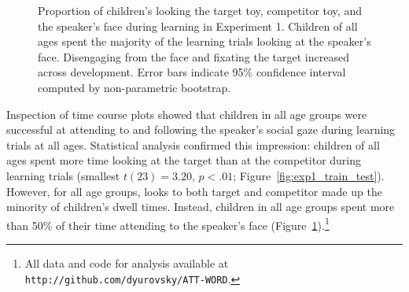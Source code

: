 \documentclass[man,floatsintext]{apa6}
\begin{document}
 \begin{figure}[tb]
	\caption{\label{fig:exp1_train} Proportion of children's looking the target toy, competitor toy, and the speaker's face during learning in Experiment 1. Children of all ages spent the majority of the learning trials looking at the speaker's face. Disengaging from the face and fixating the target increased across development. Error bars indicate 95\% confidence interval computed by non-parametric bootstrap.}
\end{figure}

Inspection of time course plots showed that children in all age groups were successful at attending to and following the speaker's social gaze during learning trials at all ages. Statistical analysis confirmed this impression: children of all ages spent more time looking at the target than at the competitor during learning trials (smallest $t(23)  = 3.20$, $p < .01$; Figure~\ref{fig:exp1_train_test}). However, for all age groups, looks to both target and competitor made up the minority of children's dwell times. Instead, children in all age groups spent more than 50\% of their time attending to the speaker's face (Figure~\ref{fig:exp1_train}).\footnote{All data and code for analysis available at \small{\tt{http://github.com/dyurovsky/ATT-WORD}}.} 
\end{document}
